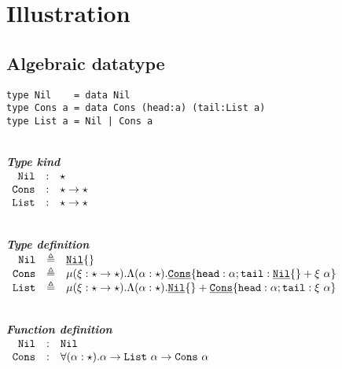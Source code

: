 \documentclass{article}[11pt]
\newcommand{\subsubsubsection}[1]
{
    ~\\
    {\bf {\em #1}} \\
}
\newcommand{\term}[1]{\verb~#1~}
\newcommand{\cons}[1]{\underline{\verb~#1~}}
\begin{document}
    \section{Illustration}\label{sec:illustration}

    \subsection{Algebraic datatype}\label{subsec:algebraic-datatype}

    \begin{verbatim}
type Nil    = data Nil
type Cons a = data Cons (head:a) (tail:List a)
type List a = Nil | Cons a
    \end{verbatim}

    \subsubsubsection{Type kind}

    \noindent
    \begin{math}
        \begin{array}{rclp{5cm}}
            \term{Nil}  & : & \star                   \\
            \term{Cons} & : & \star \rightarrow \star \\
            \term{List} & : & \star \rightarrow \star
        \end{array}
    \end{math}

    \subsubsubsection{Type definition}

    \noindent
    \begin{math}
        \begin{array}{rclp{5cm}}
            \term{Nil}  & \triangleq & \cons{Nil}\{\}                                                                                                \\
            \term{Cons} & \triangleq & \mu(\xi:\star \rightarrow \star).\Lambda(\alpha:\star).\cons{Cons}\{ \term{head} :\alpha; \term{tail} : \cons{Nil}\{\} + \xi ~ \alpha \}                \\
            \term{List} & \triangleq & \mu(\xi:\star \rightarrow \star).\Lambda(\alpha:\star).\cons{Nil}\{\} + \cons{Cons}\{ \term{head} :\alpha; \term{tail} : \xi ~ \alpha \}
        \end{array}
    \end{math}

    \subsubsubsection{Function definition}

    \noindent
    \begin{math}
        \begin{array}{rclp{5cm}}
            \term{Nil}  & : & \term{Nil}                                                                                   \\
            \term{Cons} & : & \forall(\alpha:\star).\alpha \rightarrow \term{List}~\alpha \rightarrow \term{Cons} ~ \alpha \\
        \end{array}
    \end{math}
\end{document}

